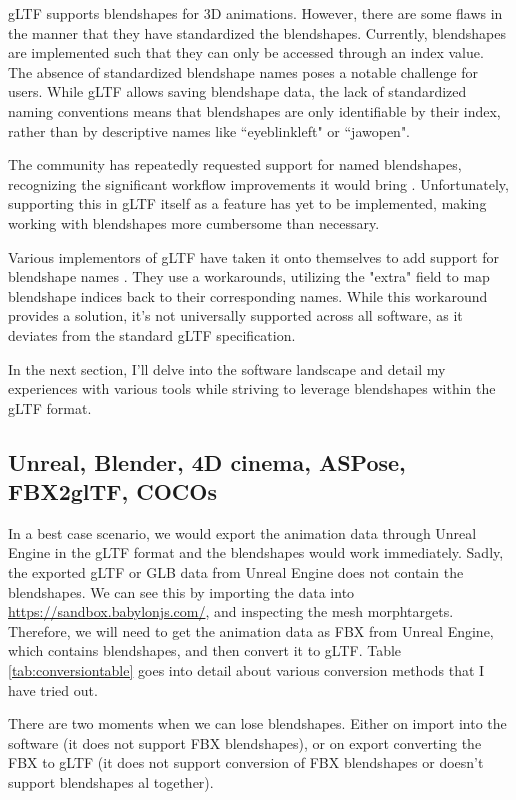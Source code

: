 \documentclass{uva-inf-article}
\begin{document}
gLTF supports blendshapes for 3D animations. However, there are some flaws in the manner that they have standardized the blendshapes. Currently, blendshapes are implemented such that they can only be accessed through an index value\cite{bsdocu}. The absence of standardized blendshape names poses a notable challenge for users. While gLTF allows saving blendshape data, the lack of standardized naming conventions means that blendshapes are only identifiable by their index, rather than by descriptive names like ``eyeblinkleft" or ``jawopen".

The community has repeatedly requested support for named blendshapes, recognizing the significant workflow improvements it would bring \cite{gitmorphnames}. Unfortunately, supporting this in gLTF itself as a feature has yet to be implemented, making working with blendshapes more cumbersome than necessary.

Various implementors of gLTF have taken it onto themselves to add support for blendshape names \cite{facebookincubatorgLTF, Maya2glTF, threegLTF, babylongLTF}. They use a workarounds, utilizing the "extra" field to map blendshape indices back to their corresponding names. While this workaround provides a solution, it's not universally supported across all software, as it deviates from the standard gLTF specification.

In the next section, I'll delve into the software landscape and detail my experiences with various tools while striving to leverage blendshapes within the gLTF format.

\subsection{Unreal, Blender, 4D cinema, ASPose, FBX2glTF, COCOs}
In a best case scenario, we would export the animation data through Unreal Engine in the gLTF format and the blendshapes would work immediately. Sadly, the exported gLTF or GLB data from Unreal Engine does not contain the blendshapes. We can see this by importing the data into \url{https://sandbox.babylonjs.com/}, and inspecting the mesh morphtargets. Therefore, we will need to get the animation data as FBX from Unreal Engine, which contains blendshapes, and then convert it to gLTF.
Table \ref{tab:conversiontable} goes into detail about various conversion methods that I have tried out.

There are two moments when we can lose blendshapes. Either on import into the software (it does not support FBX blendshapes), or on export converting the FBX to gLTF (it does not support conversion of FBX blendshapes or doesn't support blendshapes al together).
\end{document}
